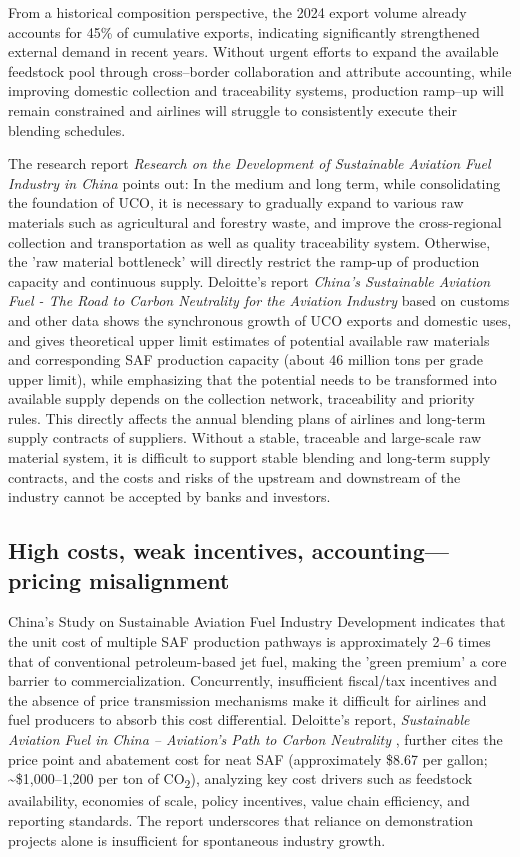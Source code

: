 \documentclass[a4paper,11pt]{article}
\begin{document}
From a historical composition perspective, the 2024 export volume already accounts for 45\% of cumulative exports, indicating significantly strengthened external demand in recent years. Without urgent efforts to expand the available feedstock pool through cross--border collaboration and attribute accounting, while improving domestic collection and traceability systems, production ramp--up will remain constrained and airlines will struggle to consistently execute their blending schedules.


The research report \textit{Research on the Development of Sustainable Aviation Fuel Industry in China} points out: In the medium and long term, while consolidating the foundation of UCO, it is necessary to gradually expand to various raw materials such as agricultural and forestry waste, and improve the cross-regional collection and transportation as well as quality traceability system. Otherwise, the 'raw material bottleneck' will directly restrict the ramp-up of production capacity and continuous supply. Deloitte's report \textit{China's Sustainable Aviation Fuel - The Road to Carbon Neutrality for the Aviation Industry} \cite{deloitte2023} based on customs and other data shows the synchronous growth of UCO exports and domestic uses, and gives theoretical upper limit estimates of potential available raw materials and corresponding SAF production capacity (about 46 million tons per grade upper limit), while emphasizing that the potential needs to be transformed into available supply depends on the collection network, traceability and priority rules. This directly affects the annual blending plans of airlines and long-term supply contracts of suppliers. Without a stable, traceable and large-scale raw material system, it is difficult to support stable blending and long-term supply contracts, and the costs and risks of the upstream and downstream of the industry cannot be accepted by banks and investors.

\subsection{High costs, weak incentives, accounting---pricing misalignment}
China's Study on Sustainable Aviation Fuel Industry Development \cite{tian2025} indicates that the unit cost of multiple SAF production pathways is approximately 2--6 times that of conventional petroleum-based jet fuel, making the 'green premium' a core barrier to commercialization. Concurrently, insufficient fiscal/tax incentives and the absence of price transmission mechanisms make it difficult for airlines and fuel producers to absorb this cost differential. Deloitte's report, \textit{Sustainable Aviation Fuel in China -- Aviation's Path to Carbon Neutrality} \cite{deloitte2023}, further cites the price point and abatement cost for neat SAF (approximately \$8.67 per gallon; \textasciitilde\$1,000--1,200 per ton of CO\textsubscript{2}), analyzing key cost drivers such as feedstock availability, economies of scale, policy incentives, value chain efficiency, and reporting standards. The report underscores that reliance on demonstration projects alone is insufficient for spontaneous industry growth.
\end{document}
